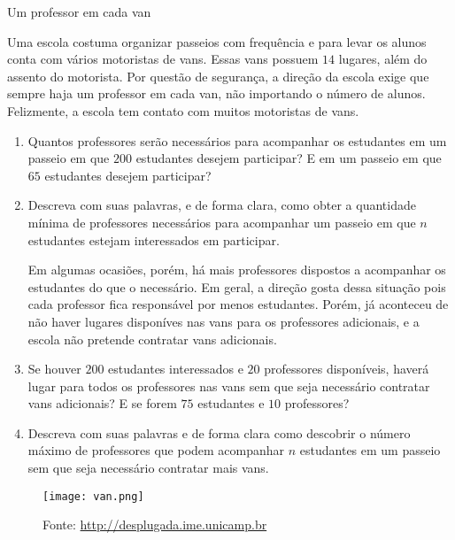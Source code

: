 \begin{task}{Um professor em cada van}
\label{comp-task5}

Uma escola costuma organizar passeios com frequência e para levar os alunos conta com vários motoristas de vans. Essas vans possuem $14$ lugares, além do assento do motorista. Por questão de segurança, a direção da escola exige que sempre haja um professor em cada van, não importando o número de alunos. Felizmente, a escola tem contato com muitos motoristas de vans.

\begin{enumerate}
\item Quantos professores serão necessários para acompanhar os estudantes em um passeio em que $200$ estudantes desejem participar? E em um passeio em que $65$ estudantes desejem participar?

\item Descreva com suas palavras, e de forma clara, como obter a quantidade mínima de professores necessários para acompanhar um passeio em que $n$ estudantes estejam interessados em participar.

Em algumas ocasiões, porém, há mais professores dispostos a acompanhar os estudantes do que o necessário. Em geral, a direção gosta dessa situação pois cada professor fica responsável por menos estudantes. Porém, já aconteceu de não haver lugares disponíves nas vans para os professores adicionais, e a escola não pretende contratar vans adicionais.

\item Se houver $200$ estudantes interessados e $20$ professores disponíveis, haverá lugar para todos os professores nas vans sem que seja necessário contratar vans adicionais? E se forem $75$ estudantes e $10$ professores?

\item Descreva com suas palavras e de forma clara como descobrir o número máximo de professores que podem acompanhar $n$ estudantes em um passeio sem que seja necessário contratar mais vans.
\end{enumerate}

\begin{figure}[H]
\centering
\texttt{[image: van.png]}
\caption{Fonte: \url{http://desplugada.ime.unicamp.br}}
\end{figure}

\end{task}

\label{comp-arr3}

